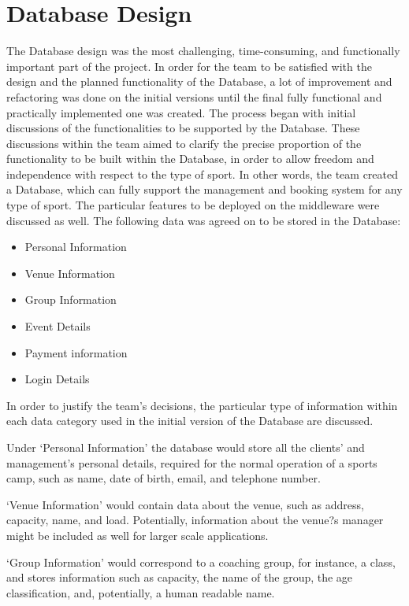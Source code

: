 \documentclass{l3proj}
\begin{document}
\section{Database Design}
\par
The Database design was the most challenging, time-consuming, and functionally important part of the project. In order for the team to be satisfied with the design and the planned functionality of the Database, a lot of improvement and refactoring was done on the initial versions until the final fully functional and practically implemented one was created. The process began with initial discussions of the functionalities to be supported by the Database. These discussions within the team aimed to clarify the precise proportion of the functionality to be built within the Database, in order to allow freedom and independence with respect to the type of sport. In other words, the team created a Database, which can fully support the management and booking system for any type of sport. The particular features to be deployed on the middleware were discussed as well. The following data was agreed on to be stored in the Database:
\begin{itemize}
	\item Personal Information
	\item Venue Information
	\item Group Information
	\item Event Details
	\item Payment information
	\item Login Details
\end{itemize}
\par In order to justify the team's decisions, the particular type of information within each data category used in the initial version of the Database are discussed.\\
\par
Under `Personal Information' the database would store all the clients' and management's personal details, required for the normal operation of a sports camp, such as name, date of birth, email, and telephone number.\\
\par
`Venue Information' would contain data about the venue, such as address, capacity, name, and load. Potentially, information about the venue?s manager might be included as well for larger scale applications.\\
\par
`Group Information' would correspond to a coaching group, for instance, a class, and stores information such as capacity, the name of the group, the age classification, and, potentially, a human readable name.\\
\end{document}
